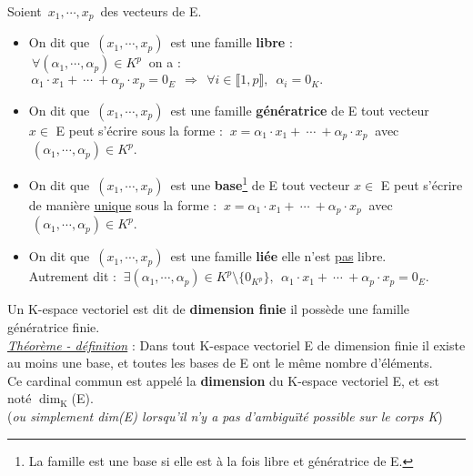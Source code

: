 \noindent Soient $\,x_1,\cdots,x_p\,$ des vecteurs de E.
\begin{itemize}[leftmargin=1cm, label=•]
    \item On dit que $\,(x_1,\cdots,x_p)\,$ est une famille \textbf{libre} \ssi :\vspace{0.1cm} \\ \(\ \forall(\alpha_1, \cdots, \alpha_p)\in K^p\ \) on a : \(\, \alpha_1 \cdot x_1 + \ \cdots \ + \alpha_p \cdot x_p=0_E\ \ \Rightarrow \ \ \forall i\in \llbracket 1,p \rrbracket ,\ \;\alpha_i = 0_K. \) \vspace{0.3cm}

     \item On dit que $\,(x_1,\cdots,x_p)\,$ est une famille \textbf{génératrice} de E \ssi tout vecteur\vspace{0.1cm}\\ \(x\in\) E
     peut s'écrire sous la forme : \(\ x=\alpha_1 \cdot x_1 + \ \cdots \ + \alpha_p \cdot x_p\ \) avec \(\ (\alpha_1, \cdots, \alpha_p)\in K^p\). \vspace{0.3cm}

     \item On dit que $\,(x_1,\cdots,x_p)\,$ est une \textbf{base}\footnote{La famille est une base si elle est à la fois libre et génératrice de E.} de E \ssi tout vecteur \(x\in\) E peut s'écrire\vspace{0.1cm}\\
     de manière \underline{unique} sous la forme : \(\ x=\alpha_1 \cdot x_1 + \ \cdots \ + \alpha_p \cdot x_p\ \) avec \(\ (\alpha_1, \cdots, \alpha_p)\in K^p\).\vspace{0.3cm}

      \item On dit que $\,(x_1,\cdots,x_p)\,$ est une famille \textbf{liée} \ssi elle n'est \underline{pas} libre. \vspace{0.1cm}\\
      Autrement dit : \(\ \exists (\alpha_1, \cdots, \alpha_p)\in K^p\setminus\{0_{K^p}\},\ \ \alpha_1 \cdot x_1 + \ \cdots \ + \alpha_p \cdot x_p=0_E. \)
\end{itemize}

\vspace{1.6cm}

Un K-espace vectoriel est dit de \textbf{dimension finie} \ssi il possède une famille\\
génératrice finie.\vspace{0.1cm} \\
\hspace*{0.5cm} \underline{\emph{Théorème - définition}} : Dans tout K-espace vectoriel E de dimension finie il existe au moins une base, et toutes les bases de E ont le même nombre d'éléments.\\
Ce cardinal commun est appelé la \textbf{dimension} du K-espace vectoriel E, et est noté \(\dim_\text{K}\)(E).\\ (\emph{ou simplement dim(E) lorsqu'il n'y a pas d'ambiguïté possible sur le corps K})

